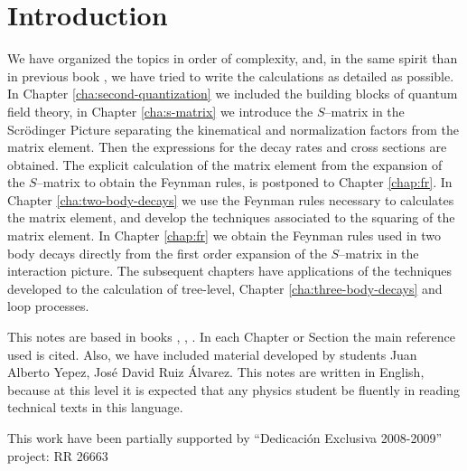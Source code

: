
\chapter*{Introduction}
\label{cha:introduction} %


We have organized the topics in order of complexity, and, in the same
spirit than in  previous book \cite{lsm}, we have tried to write the
calculations as detailed as possible. In
Chapter 
\ref{cha:second-quantization} %
we included the building blocks
of quantum field theory, in Chapter 
\ref{cha:s-matrix} %
we introduce
the $S$--matrix in the Scr\"odinger Picture separating the kinematical
and normalization factors from the matrix element. Then the expressions
for the decay rates and cross sections are obtained. The explicit
calculation of the matrix element from the expansion of the
$S$--matrix to obtain the Feynman rules, is postponed to Chapter
\ref{chap:fr}. %
In Chapter 
\ref{cha:two-body-decays} %
we use the Feynman
rules necessary to calculates the matrix element, and develop the
techniques associated to the squaring of the matrix element. In
Chapter 
\ref{chap:fr} %
we obtain the Feynman rules used in two body
decays directly from the first order expansion of the $S$--matrix in
the interaction picture. The subsequent chapters have applications of
the techniques developed to the calculation of tree-level, 
Chapter 
\ref{cha:three-body-decays} %
and loop processes.


This notes are based in books \cite{Maggiore:2005qv}, \cite{Mandl:1985bg}, \cite{Lahiri:2005sm}.  In each Chapter or Section the main reference used is cited. Also, we have included material developed by students Juan Alberto Yepez, Jos\'e David Ruiz \'Alvarez. This notes are written in English, because at this level it is expected that any physics student be fluently in reading technical texts in this language.

This work have been partially supported by ``Dedicaci\'on Exclusiva 2008-2009''  project: RR 26663


